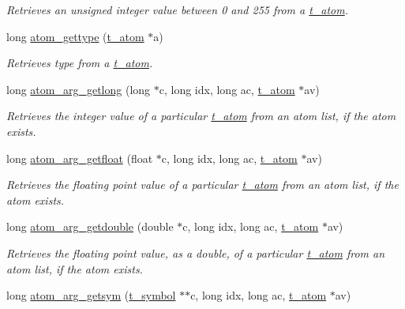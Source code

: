 \begin{DoxyCompactItemize}
\begin{DoxyCompactList}\small\item\em Retrieves an unsigned integer value between 0 and 255 from a \hyperlink{structt__atom}{t\_\-atom}. \item\end{DoxyCompactList}\item 
long \hyperlink{group__atom_ga7959e9b765bf2eb52223587d8282a49e}{atom\_\-gettype} (\hyperlink{structt__atom}{t\_\-atom} $\ast$a)
\begin{DoxyCompactList}\small\item\em Retrieves type from a \hyperlink{structt__atom}{t\_\-atom}. \item\end{DoxyCompactList}\item 
long \hyperlink{group__atom_gaba53e6f86741dea07cff414b9b5d6a8b}{atom\_\-arg\_\-getlong} (long $\ast$c, long idx, long ac, \hyperlink{structt__atom}{t\_\-atom} $\ast$av)
\begin{DoxyCompactList}\small\item\em Retrieves the integer value of a particular \hyperlink{structt__atom}{t\_\-atom} from an atom list, if the atom exists. \item\end{DoxyCompactList}\item 
long \hyperlink{group__atom_ga06e305ddb4fde46ef2e8b66a7e578d61}{atom\_\-arg\_\-getfloat} (float $\ast$c, long idx, long ac, \hyperlink{structt__atom}{t\_\-atom} $\ast$av)
\begin{DoxyCompactList}\small\item\em Retrieves the floating point value of a particular \hyperlink{structt__atom}{t\_\-atom} from an atom list, if the atom exists. \item\end{DoxyCompactList}\item 
long \hyperlink{group__atom_ga5f494e92bded5005a52a31738f8cbbdf}{atom\_\-arg\_\-getdouble} (double $\ast$c, long idx, long ac, \hyperlink{structt__atom}{t\_\-atom} $\ast$av)
\begin{DoxyCompactList}\small\item\em Retrieves the floating point value, as a double, of a particular \hyperlink{structt__atom}{t\_\-atom} from an atom list, if the atom exists. \item\end{DoxyCompactList}\item 
long \hyperlink{group__atom_gaeba7a400021327a46673220ef1c1ee98}{atom\_\-arg\_\-getsym} (\hyperlink{structt__symbol}{t\_\-symbol} $\ast$$\ast$c, long idx, long ac, \hyperlink{structt__atom}{t\_\-atom} $\ast$av)
$$
\end{DoxyCompactItemize}
